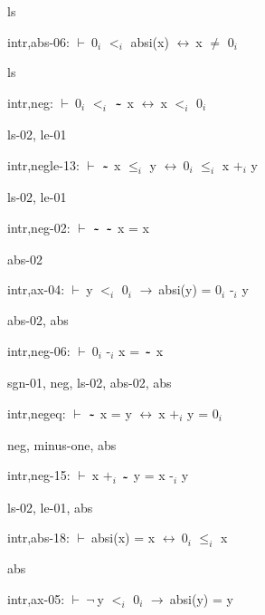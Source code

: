 \documentclass[a4paper]{article}
\newcommand{\tildesym}{\raisebox{-4pt}{\bf\~{}}}
\newcommand{\Fol}{\mbox{$\vdash\ $}}
\newcommand{\Not}{\mbox{$\neg\ $}}
\newcommand{\Imp}{\mbox{$\rightarrow\ $}}
\newcommand{\Equiv}{\mbox{$\leftrightarrow\ $}}
\begin{document}
ls

\bigskip

intr,abs-06: 
 \Fol $\mbox{0}_{i}$ $\mbox{$<$}_{i}$ absi(x) \Equiv x $\neq$ $\mbox{0}_{i}$



ls

\bigskip

intr,neg: 
 \Fol $\mbox{0}_{i}$ $\mbox{$<$}_{i}$ $\tildesym$ x \Equiv x $\mbox{$<$}_{i}$ $\mbox{0}_{i}$



ls-02, le-01

\bigskip

intr,negle-13: 
 \Fol $\tildesym$ x $\mbox{$\le$}_{i}$ y \Equiv $\mbox{0}_{i}$ $\mbox{$\le$}_{i}$ x $\mbox{+}_{i}$ y



ls-02, le-01

\bigskip

intr,neg-02: 
 \Fol $\tildesym$ $\tildesym$ x = x



abs-02

\bigskip

intr,ax-04: 
 \Fol y $\mbox{$<$}_{i}$ $\mbox{0}_{i}$ \Imp absi(y) = $\mbox{0}_{i}$ $\mbox{-}_{i}$ y



abs-02, abs

\bigskip

intr,neg-06: 
 \Fol $\mbox{0}_{i}$ $\mbox{-}_{i}$ x = $\tildesym$ x



sgn-01, neg, ls-02, abs-02, abs

\bigskip

intr,negeq: 
 \Fol $\tildesym$ x = y \Equiv x $\mbox{+}_{i}$ y = $\mbox{0}_{i}$



neg, minus-one, abs

\bigskip

intr,neg-15: 
 \Fol x $\mbox{+}_{i}$ $\tildesym$ y = x $\mbox{-}_{i}$ y



ls-02, le-01, abs

\bigskip

intr,abs-18: 
 \Fol absi(x) = x \Equiv $\mbox{0}_{i}$ $\mbox{$\le$}_{i}$ x



abs

\bigskip

intr,ax-05: 
 \Fol \Not y $\mbox{$<$}_{i}$ $\mbox{0}_{i}$ \Imp absi(y) = y
\end{document}
